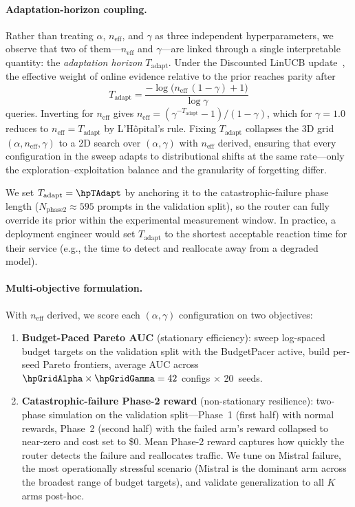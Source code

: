 \paragraph{Adaptation-horizon coupling.}
Rather than treating $\alpha$, $n_{\text{eff}}$, and $\gamma$ as three
independent hyperparameters, we observe that two of
them---$n_{\text{eff}}$ and $\gamma$---are linked through a single
interpretable quantity: the \emph{adaptation horizon} $T_{\text{adapt}}$.
Under the Discounted LinUCB update~\cite{russac2019weighted}, the
effective weight of online evidence relative to the prior reaches
parity after
%
\begin{equation}\label{eq:t_adapt}
  T_{\text{adapt}} = \frac{-\log\bigl(n_{\text{eff}}\,(1{-}\gamma) + 1\bigr)}{\log \gamma}
\end{equation}
%
queries.  Inverting for $n_{\text{eff}}$ gives
$n_{\text{eff}} = (\gamma^{-T_{\text{adapt}}} - 1) / (1 - \gamma)$,
which for $\gamma{=}1.0$ reduces to $n_{\text{eff}} = T_{\text{adapt}}$
by L'H\^opital's rule.
Fixing $T_{\text{adapt}}$ collapses the 3D grid
$(\alpha, n_{\text{eff}}, \gamma)$ to a 2D search over
$(\alpha, \gamma)$ with $n_{\text{eff}}$ derived, ensuring that every
configuration in the sweep adapts to distributional shifts at
the same rate---only the exploration--exploitation balance
and the granularity of forgetting differ.

We set $T_{\text{adapt}} = \hpTAdapt$ by anchoring it to the
catastrophic-failure phase length ($N_{\text{phase2}} \approx 595$
prompts in the validation split), so the router can fully override
its prior within the experimental measurement window.
In practice, a deployment engineer would set $T_{\text{adapt}}$ to the
shortest acceptable reaction time for their service (e.g., the
time to detect and reallocate away from a degraded model).

\paragraph{Multi-objective formulation.}
With $n_{\text{eff}}$ derived, we score each $(\alpha, \gamma)$
configuration on two objectives:
%
\begin{enumerate}[nosep,leftmargin=*]
  \item \textbf{Budget-Paced Pareto AUC} (stationary efficiency):
    sweep log-spaced budget targets on the validation split with the
    BudgetPacer active, build per-seed Pareto frontiers, average AUC
    across $\hpGridAlpha \times \hpGridGamma = 42$ configs $\times$ 20~seeds.

  \item \textbf{Catastrophic-failure Phase-2 reward} (non-stationary
    resilience):
    two-phase simulation on the validation split---Phase~1 (first
    half) with normal rewards, Phase~2 (second half) with the failed
    arm's reward collapsed to near-zero and cost set to \$0.
    Mean Phase-2 reward captures how quickly the router detects the
    failure and reallocates traffic.
    We tune on Mistral failure, the most operationally stressful
    scenario (Mistral is the dominant arm across the broadest range
    of budget targets), and validate generalization to all $K$ arms
    post-hoc.
\end{enumerate}

